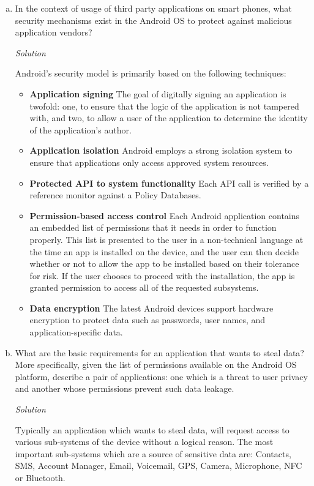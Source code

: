 \documentclass[a4paper,11pt]{article}
\newenvironment{solution}%
{\par\begin{minipage}{\linewidth}{\noindent\small\textit{Solution}\\}\begin{boxedminipage}{\linewidth}}%
{\end{boxedminipage}\end{minipage}\par\bigskip}
\begin{document}
\begin{enumerate} [(a)]
\newpage
\item In the context of usage of third party applications on smart phones,
  what security mechanisms exist in the Android OS to protect against
  malicious application vendors?
\ifsolution\begin{solution}
Android's security model is primarily based on the following techniques:
\begin{itemize}
\item \textbf{Application signing} The goal of digitally signing an application is twofold: one, to ensure that the logic of the application is not tampered with, and two, to allow a user of the application to determine the identity of the application's author.
\item \textbf{Application isolation} Android employs a strong isolation system to ensure that applications only access approved system resources.
\item \textbf{Protected API to system functionality} Each API call is verified by a reference monitor against a Policy Databases.
\item \textbf{Permission-based access control} Each Android application contains an embedded list of permissions that it needs in order to function properly. This list is presented to the user in a non-technical language at the time an app is installed on the device, and the user can then decide whether or not to allow the app to be installed based on their tolerance for risk. If the user chooses to proceed with the installation, the app is granted permission to access all of the requested subsystems. 
\item \textbf{Data encryption} The latest Android devices support hardware encryption to protect data such as passwords, user names, and application-specific data.
\end{itemize}

\end{solution}\fi

\item What are the basic requirements for an application that wants to steal
  data? More specifically, given the list of permissions available on the
  Android OS platform, describe a pair of applications: one which is a threat
  to user privacy and another whose permissions prevent such data leakage.
\ifsolution\begin{solution}

Typically an application which wants to steal data, will request access to various sub-systems of the device without a logical reason. The most important sub-systems which are a source of sensitive data are: Contacts, SMS, Account Manager, Email, Voicemail, GPS, Camera, Microphone, NFC or Bluetooth.


\end{solution}
\end{enumerate}
\end{document}
